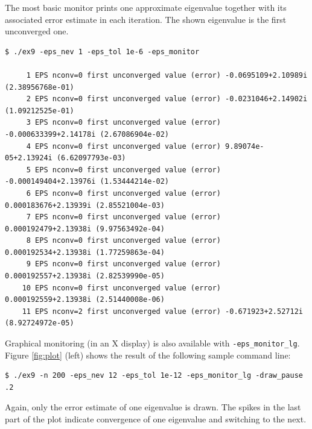 	The most basic monitor prints one approximate eigenvalue together with its associated error estimate in each iteration. The shown eigenvalue is the first unconverged one.
\begin{Verbatim}[fontsize=\footnotesize,numbers=none]
   $ ./ex9 -eps_nev 1 -eps_tol 1e-6 -eps_monitor

     1 EPS nconv=0 first unconverged value (error) -0.0695109+2.10989i (2.38956768e-01)
     2 EPS nconv=0 first unconverged value (error) -0.0231046+2.14902i (1.09212525e-01)
     3 EPS nconv=0 first unconverged value (error) -0.000633399+2.14178i (2.67086904e-02)
     4 EPS nconv=0 first unconverged value (error) 9.89074e-05+2.13924i (6.62097793e-03)
     5 EPS nconv=0 first unconverged value (error) -0.000149404+2.13976i (1.53444214e-02)
     6 EPS nconv=0 first unconverged value (error) 0.000183676+2.13939i (2.85521004e-03)
     7 EPS nconv=0 first unconverged value (error) 0.000192479+2.13938i (9.97563492e-04)
     8 EPS nconv=0 first unconverged value (error) 0.000192534+2.13938i (1.77259863e-04)
     9 EPS nconv=0 first unconverged value (error) 0.000192557+2.13938i (2.82539990e-05)
    10 EPS nconv=0 first unconverged value (error) 0.000192559+2.13938i (2.51440008e-06)
    11 EPS nconv=2 first unconverged value (error) -0.671923+2.52712i (8.92724972e-05)
\end{Verbatim}

	Graphical monitoring (in an X display) is also available with \Verb!-eps_monitor_lg!. Figure \ref{fig:plot} (left) shows the result of the following sample command line:
\begin{Verbatim}[fontsize=\footnotesize,numbers=none]
   $ ./ex9 -n 200 -eps_nev 12 -eps_tol 1e-12 -eps_monitor_lg -draw_pause .2
\end{Verbatim}
Again, only the error estimate of one eigenvalue is drawn. The spikes in the last part of the plot indicate convergence of one eigenvalue and switching to the next.

